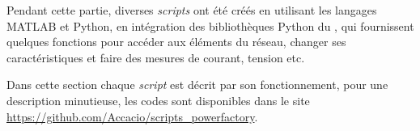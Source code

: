 Pendant cette partie, diverses \textit{scripts} ont été créés en utilisant les langages MATLAB et Python, en intégration des bibliothèques Python du \powerfactory, qui fournissent quelques fonctions pour accéder aux éléments du réseau, changer ses caractéristiques et faire des mesures de courant, tension etc.

Dans cette section chaque \textit{script} est décrit par son fonctionnement, pour une description minutieuse, les codes sont disponibles dans le site \url{https://github.com/Accacio/scripts_powerfactory}.


